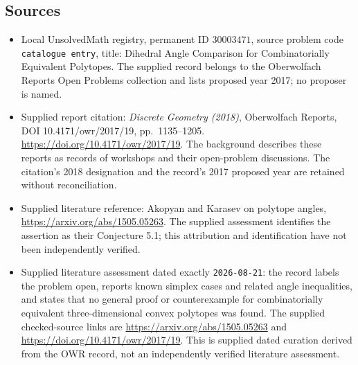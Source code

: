 \documentclass[11pt]{article}
\begin{document}
\subsection{Sources}
\begin{itemize}
\item Local UnsolvedMath registry, permanent ID \(30003471\), source problem code \texttt{catalogue entry}, title: Dihedral Angle Comparison for Combinatorially Equivalent Polytopes. The supplied record belongs to the Oberwolfach Reports Open Problems collection and lists proposed year 2017; no proposer is named.
\item Supplied report citation: \emph{Discrete Geometry (2018)}, Oberwolfach Reports, DOI 10.4171/owr/2017/19, pp.\ 1135--1205. \url{https://doi.org/10.4171/owr/2017/19}. The background describes these reports as records of workshops and their open-problem discussions. The citation's 2018 designation and the record's 2017 proposed year are retained without reconciliation.
\item Supplied literature reference: Akopyan and Karasev on polytope angles, \url{https://arxiv.org/abs/1505.05263}. The supplied assessment identifies the assertion as their Conjecture 5.1; this attribution and identification have not been independently verified.
\item Supplied literature assessment dated exactly \texttt{2026-08-21}: the record labels the problem open, reports known simplex cases and related angle inequalities, and states that no general proof or counterexample for combinatorially equivalent three-dimensional convex polytopes was found. The supplied checked-source links are \url{https://arxiv.org/abs/1505.05263} and \url{https://doi.org/10.4171/owr/2017/19}. This is supplied dated curation derived from the OWR record, not an independently verified literature assessment.
\end{itemize}
\end{document}
